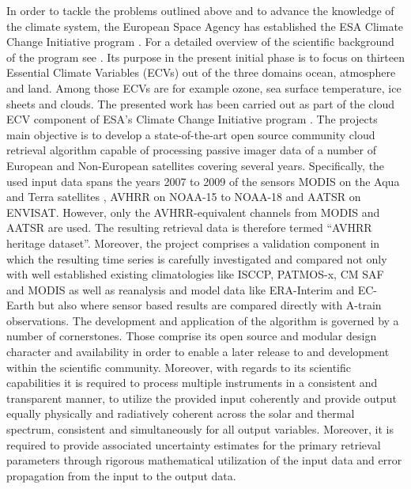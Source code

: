 \documentclass[amt]{style/copernicus}
\begin{document}
In order to tackle the problems outlined above and to advance the knowledge of
the climate system, the European Space Agency has established the ESA Climate
Change Initiative program \citep{ESA_CCI_web}. For a detailed
overview of the scientific background of the program see
\citet{Hollmann13}. Its purpose in the present initial phase is to focus on
thirteen Essential Climate Variables (ECVs) out of the three domains ocean,
atmosphere and land. Among those ECVs are for example ozone, sea surface
temperature, ice sheets and clouds. The presented work has been carried out as
part of the cloud ECV component  of ESA's Climate Change Initiative program
\citep{ESA_Cloud_CCI_web}. The projects main objective is to develop a
state-of-the-art open source community cloud retrieval algorithm capable of
processing passive imager data of a number of European and Non-European
satellites covering several years. Specifically, the used input data spans the
years 2007 to 2009 of the sensors MODIS on the Aqua and Terra satellites
\citep{King92}, AVHRR on NOAA-15 to NOAA-18 \citep{Jacobowitz03} and AATSR on ENVISAT. However, only the AVHRR-equivalent channels from MODIS and AATSR are used. The resulting retrieval data is therefore termed ``AVHRR heritage dataset''. Moreover, the project comprises a validation component in which the resulting time series is carefully investigated and compared not only with well established existing climatologies like ISCCP, PATMOS-x, CM SAF and MODIS as well as reanalysis and model data like ERA-Interim and EC-Earth but also where sensor based results are compared directly with A-train observations. %
The development and application of the algorithm is governed by a number of cornerstones. Those comprise its open source and modular design character and availability in order to enable a later release to and development within the scientific community. Moreover, with regards to its scientific capabilities it is required to process multiple instruments in a consistent and transparent manner, to utilize the provided input coherently and provide output equally physically and radiatively coherent across the solar and thermal spectrum, consistent and simultaneously for all output variables. Moreover, it is required to provide associated uncertainty estimates for the primary retrieval parameters through rigorous mathematical utilization of the input data and error propagation from the input to the output data.
\end{document}
